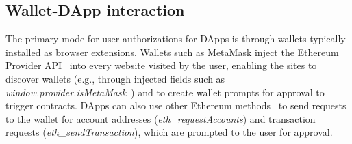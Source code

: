\documentclass[conference]{IEEEtran}
\begin{document}

\subsection{Wallet-DApp interaction}
The primary mode for user authorizations for DApps is through wallets typically installed as browser extensions.
Wallets such as MetaMask inject the Ethereum Provider API~\cite{providerAPI} into every website visited by the user, enabling the sites to discover wallets (e.g., through injected fields such as \textit{window.provider.isMetaMask}~\cite{metamaskProviderApi}) and to create wallet prompts for approval to trigger contracts.
DApps can also use other Ethereum methods~\cite{metamaskJsonRpcApi} to send requests to the wallet for account addresses (\textit{eth\_requestAccounts})
and transaction requests (\textit{eth\_sendTransaction}), which are prompted to the user for approval.
\end{document}
